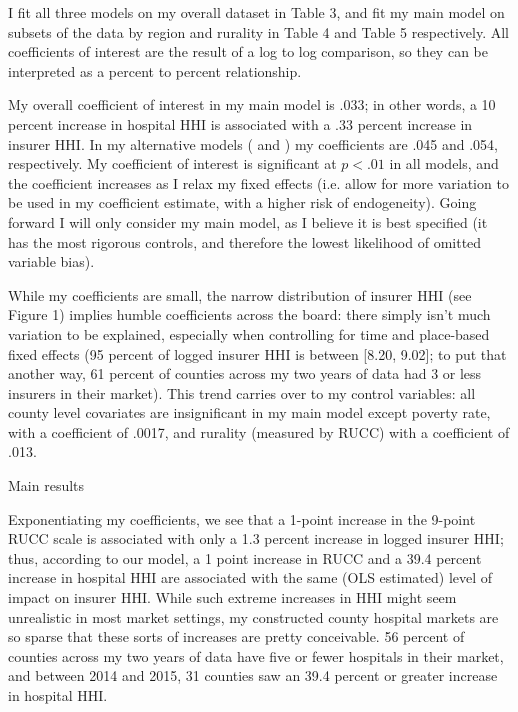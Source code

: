 \documentclass[12pt,letterpaper]{article}
\begin{document}
I fit all three models on my overall dataset in Table 3, and fit my main model on subsets of the data by region and rurality in Table 4 and Table 5 respectively. All coefficients of interest are the result of a log to log comparison, so they can be interpreted as a percent to percent relationship. 

My overall coefficient of interest in my main model is .033; in other words, a 10 percent increase in hospital HHI is associated with a .33 percent increase in insurer HHI. In my alternative models (\citet{boozary_association_2019} and \citet{griffith_diminishing_2018}) my coefficients are .045 and .054, respectively. My coefficient of interest is significant at $p<.01$ in all models, and the coefficient increases as I relax my fixed effects (i.e. allow for more variation to be used in my coefficient estimate, with a higher risk of endogeneity). Going forward I will only consider my main model, as I believe it is best specified (it has the most rigorous controls, and therefore the lowest likelihood of omitted variable bias).

While my coefficients are small, the narrow distribution of insurer HHI (see Figure 1) implies humble coefficients across the board: there simply isn't much variation to be explained, especially when controlling for time and place-based fixed effects (95 percent of logged insurer HHI is between [8.20, 9.02]; to put that another way, 61 percent of counties across my two years of data had 3 or less insurers in their market). This trend carries over to my control variables: all county level covariates are insignificant in my main model except poverty rate, with a coefficient of .0017, and rurality (measured by RUCC) with a coefficient of .013. 

\begin{table}[!h]
\centering
\caption{Main results}

\end{table}

Exponentiating my coefficients, we see that a 1-point increase in the 9-point RUCC scale is associated with only a 1.3 percent increase in logged insurer HHI; thus, according to our model, a 1 point increase in RUCC and a 39.4 percent increase in hospital HHI are associated with the same (OLS estimated) level of impact on insurer HHI. While such extreme increases in HHI might seem unrealistic in most market settings, my constructed county hospital markets are so sparse that these sorts of increases are pretty conceivable. 56 percent of counties across my two years of data have five or fewer hospitals in their market, and between 2014 and 2015, 31 counties saw an 39.4 percent or greater increase in hospital HHI.
\end{document}
